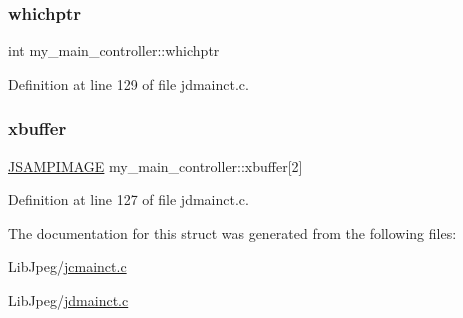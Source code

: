 \mbox{\label{structmy__main__controller_a9838025ca47813221e8c208ad26bb9e8}} 
\subsubsection{\texorpdfstring{whichptr}{whichptr}}
{\footnotesize\ttfamily int my\+\_\+main\+\_\+controller\+::whichptr}



Definition at line 129 of file jdmainct.\+c.

\mbox{\label{structmy__main__controller_a29fc35521c04489fdb6b7a7e758fb82a}} 
\subsubsection{\texorpdfstring{xbuffer}{xbuffer}}
{\footnotesize\ttfamily \mbox{\hyperlink{jpeglib_8h_a4bf858e4d42202287e786bdec2f3b62b}{J\+S\+A\+M\+P\+I\+M\+A\+GE}} my\+\_\+main\+\_\+controller\+::xbuffer\mbox{[}2\mbox{]}}



Definition at line 127 of file jdmainct.\+c.



The documentation for this struct was generated from the following files\+:\begin{DoxyCompactItemize}
\item 
Lib\+Jpeg/\mbox{\hyperlink{jcmainct_8c}{jcmainct.\+c}}\item 
Lib\+Jpeg/\mbox{\hyperlink{jdmainct_8c}{jdmainct.\+c}}\end{DoxyCompactItemize}
